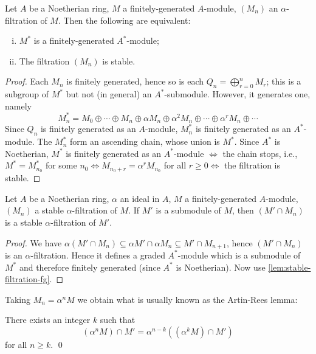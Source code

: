 \begin{lemma}\label{lem:stable-filtration-fg}
    Let $A$ be a Noetherian ring, $M$ a finitely-generated $A$-module, $(M_n)$ an $\alpha$-filtration of $M$. Then the following are equivalent:
    \begin{enumerate}[i)]
        \item $M^*$ is a finitely-generated $A^*$-module;
        \item The filtration $(M_n)$ is stable.
    \end{enumerate}
\end{lemma}
\begin{proof}
    Each $M_n$ is finitely generated, hence so is each $Q_n = \bigoplus_{r=0}^n M_r$; this is a subgroup of $M^*$ but not (in general) an $A^*$-submodule. However, it generates one, namely
    \[
    M_n^* = M_0 \oplus \cdots \oplus M_n \oplus \alpha M_n \oplus \alpha^2 M_n \oplus \cdots \oplus \alpha^r M_n \oplus \cdots
    \]
    Since $Q_n$ is finitely generated as an $A$-module, $M_n^*$ is finitely generated as an $A^*$-module. The $M_n^*$ form an ascending chain, whose union is $M^*$. Since $A^*$ is Noetherian, $M^*$ is finitely generated as an $A^*$-module $\Leftrightarrow$ the chain stops, i.e., $M^* = M_{n_0}^*$ for some $n_0 \Leftrightarrow M_{n_0+r} = \alpha^r M_{n_0}$ for all $r \geq 0 \Leftrightarrow$ the filtration is stable. 
\end{proof}

\begin{proposition}\label{pro:artin-rees}
    Let $A$ be a Noetherian ring, $\alpha$ an ideal in $A$, $M$ a finitely-generated $A$-module, $(M_n)$ a stable $\alpha$-filtration of $M$. If $M'$ is a submodule of $M$, then $(M' \cap M_n)$ is a stable $\alpha$-filtration of $M'$.
\end{proposition}
\begin{proof}
    We have $\alpha(M' \cap M_n) \subseteq \alpha M' \cap \alpha M_n \subseteq M' \cap M_{n+1}$, hence $(M' \cap M_n)$ is an $\alpha$-filtration. Hence it defines a graded $A^*$-module which is a submodule of $M^*$ and therefore finitely generated (since $A^*$ is Noetherian). Now use \eqref{lem:stable-filtration-fg}.
\end{proof}

Taking $M_n = \alpha^n M$ we obtain what is usually known as the Artin-Rees lemma:

\begin{corollary}\label{cor:artin-rees}
    There exists an integer $k$ such that
    \[
    (\alpha^n M) \cap M' = \alpha^{n-k} ((\alpha^k M) \cap M')
    \]
    for all $n \ge k$.  \qed
\end{corollary}

